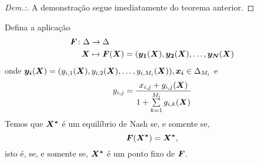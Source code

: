 \begin{proof}[Dem.:]
    A demonstração segue imediatamente do teorema anterior.
\end{proof}

\begin{theorem}
    Defina a aplicação
    \begin{align*}
        \begin{split}
            \boldsymbol{F} \colon \Delta &\to \Delta\\
            \boldsymbol{X} &\mapsto \boldsymbol{F}(\boldsymbol{X})=(\boldsymbol{y_1}(\boldsymbol{X}),\boldsymbol{y_2}(\boldsymbol{X}),\dots,\boldsymbol{y_N}(\boldsymbol{X})
        \end{split}
    \end{align*}
    onde $\boldsymbol{y_i}(\boldsymbol{X})=(y_{i,1}(\boldsymbol{X}),y_{i,2}(\boldsymbol{X}),\dots,y_{i,M_i}(\boldsymbol{X})),\boldsymbol{x_i}\in\Delta_{M_i}$ e
    \begin{equation*}
        y_{i,j}=\frac{x_{i,j}+g_{i,j}(\boldsymbol{X})}{1+\sum\limits_{k=1}^{M_i}g_{i,k}(\boldsymbol{X})}
    \end{equation*}
    Temos que $\boldsymbol{X^*}$ é um equilíbrio de Nash se, e somente se,
    \begin{equation*}
        \boldsymbol{F}(\boldsymbol{X^*})=\boldsymbol{X^*},
    \end{equation*}
    isto é, se, e somente se, $\boldsymbol{X^*}$ é um ponto fixo de $\boldsymbol{F}$.
\end{theorem}
